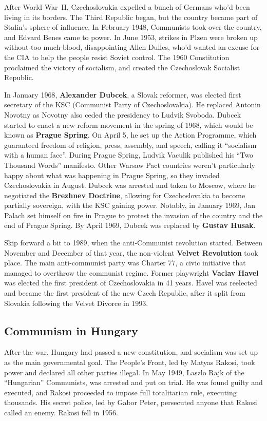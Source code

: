 After World War~II, Czechoslovakia expelled a bunch of Germans who'd been living in its borders.
The Third Republic began, but the country became part of Stalin's sphere of influence.
In February 1948, Communists took over the country, and Edvard Benes came to power.
In June 1953, strikes in Plzen were broken up without too much blood,
disappointing Allen Dulles, who'd wanted an excuse for the CIA to help the people resist Soviet control.
The 1960 Constitution proclaimed the victory of socialism, and created the Czechoslovak Socialist Republic.

In January 1968, \textbf{Alexander Dubcek}, a Slovak reformer,
was elected first secretary of the KSC (Communist Party of Czechoslovakia).
He replaced Antonin Novotny as Novotny also ceded the presidency to Ludvik Svoboda.
Dubcek started to enact a new reform movement in the spring of 1968, which would be known as \textbf{Prague Spring}.
On April 5, he set up the Action Programme, which guaranteed freedom of religion, press, assembly, and speech,
calling it ``socialism with a human face''.
During Prague Spring, Ludvik Vaculik published his ``Two Thousand Words'' manifesto.
Other Warsaw Pact countries weren't particularly happy about what was happening in Prague Spring,
so they invaded Czechoslovakia in August.
Dubcek was arrested and taken to Moscow, where he negotiated the \textbf{Brezhnev Doctrine},
allowing for Czechoslovakia to become partially sovereign, with the KSC gaining power.
Notably, in January 1969,
Jan Palach set himself on fire in Prague to protest the invasion of the country and the end of Prague Spring.
By April 1969, Dubcek was replaced by \textbf{Gustav Husak}.

Skip forward a bit to 1989, when the anti-Communist revolution started.
Between November and December of that year, the non-violent \textbf{Velvet Revolution} took place.
The main anti-communist party was Charter 77, a civic initiative that managed to overthrow the communist regime.
Former playwright \textbf{Vaclav Havel} was elected the first president of Czechoslovakia in 41 years.
Havel was reelected and became the first president of the new Czech Republic,
after it split from Slovakia following the Velvet Divorce in 1993.

\subsection*{Communism in Hungary}

After the war, Hungary had passed a new constitution, and socialism was set up as the main governmental goal.
The People's Front, led by Matyas Rakosi, took power and declared all other parties illegal.
In May 1949, Laszlo Rajk of the ``Hungarian'' Communists, was arrested and put on trial.
He was found guilty and executed, and Rakosi proceeded to impose full totalitarian rule, executing thousands.
His secret police, led by Gabor Peter, persecuted anyone that Rakosi called an enemy.
Rakosi fell in 1956.

